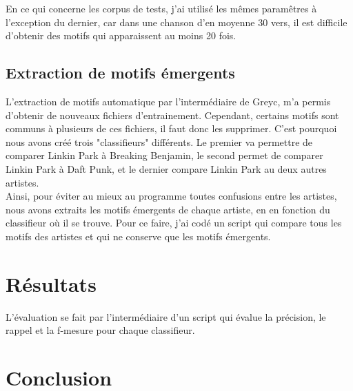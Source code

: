 \documentclass[a4paper]{article}
\begin{document}
	En ce qui concerne les corpus de tests, j'ai utilisé les mêmes paramêtres à l'exception du dernier, car dans une chanson d'en moyenne 30 vers, il est difficile d'obtenir des motifs qui apparaissent au moins 20 fois.
	
	\subsection{Extraction de motifs émergents}
	
	L'extraction de motifs automatique par l'intermédiaire de Greyc, m'a permis d'obtenir de nouveaux fichiers d'entrainement. Cependant, certains motifs sont communs à plusieurs de ces fichiers, il faut donc les supprimer. C'est pourquoi nous avons créé trois "classifieurs" différents. Le premier va permettre de comparer Linkin Park à Breaking Benjamin, le second permet de comparer Linkin Park à Daft Punk, et le dernier compare Linkin Park au deux autres artistes.\\
	
	Ainsi, pour éviter au mieux au programme toutes confusions entre les artistes, nous avons extraits les motifs émergents de chaque artiste, en en fonction du classifieur où il se trouve. Pour ce faire, j'ai codé un script qui compare tous les motifs des artistes et qui ne conserve que les motifs émergents.
	
	\section{Résultats}
	
	L'évaluation se fait par l'intermédiaire d'un script qui évalue la précision, le rappel et la f-mesure pour chaque classifieur. 
	


	\section*{Conclusion}
	
	
\end{document}
